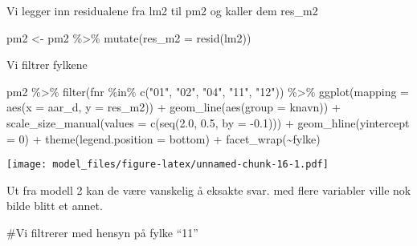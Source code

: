 \documentclass[
]{article}
\newenvironment{Shaded}{\begin{snugshade}}{\end{snugshade}}
\newcommand{\AttributeTok}[1]{\textcolor[rgb]{0.77,0.63,0.00}{#1}}
\newcommand{\DecValTok}[1]{\textcolor[rgb]{0.00,0.00,0.81}{#1}}
\newcommand{\FloatTok}[1]{\textcolor[rgb]{0.00,0.00,0.81}{#1}}
\newcommand{\FunctionTok}[1]{\textcolor[rgb]{0.00,0.00,0.00}{#1}}
\newcommand{\NormalTok}[1]{#1}
\newcommand{\OtherTok}[1]{\textcolor[rgb]{0.56,0.35,0.01}{#1}}
\newcommand{\SpecialCharTok}[1]{\textcolor[rgb]{0.00,0.00,0.00}{#1}}
\newcommand{\StringTok}[1]{\textcolor[rgb]{0.31,0.60,0.02}{#1}}
\begin{document}
Vi legger inn residualene fra lm2 til pm2 og kaller dem res\_m2

\begin{Shaded}
\begin{Highlighting}[]
\NormalTok{pm2 }\OtherTok{\textless{}{-}}\NormalTok{ pm2 }\SpecialCharTok{\%\textgreater{}\%}
  \FunctionTok{mutate}\NormalTok{(}\AttributeTok{res\_m2 =} \FunctionTok{resid}\NormalTok{(lm2))}
\end{Highlighting}
\end{Shaded}

Vi filtrer fylkene

\begin{Shaded}
\begin{Highlighting}[]
\NormalTok{pm2 }\SpecialCharTok{\%\textgreater{}\%} \FunctionTok{filter}\NormalTok{(fnr }\SpecialCharTok{\%in\%} \FunctionTok{c}\NormalTok{(}\StringTok{"01"}\NormalTok{, }\StringTok{"02"}\NormalTok{, }\StringTok{"04"}\NormalTok{, }\StringTok{"11"}\NormalTok{, }\StringTok{"12"}\NormalTok{)) }\SpecialCharTok{\%\textgreater{}\%}
\FunctionTok{ggplot}\NormalTok{(}\AttributeTok{mapping =} \FunctionTok{aes}\NormalTok{(}\AttributeTok{x =}\NormalTok{ aar\_d, }\AttributeTok{y =}\NormalTok{ res\_m2)) }\SpecialCharTok{+}
\FunctionTok{geom\_line}\NormalTok{(}\FunctionTok{aes}\NormalTok{(}\AttributeTok{group =}\NormalTok{ knavn)) }\SpecialCharTok{+}
\FunctionTok{scale\_size\_manual}\NormalTok{(}\AttributeTok{values =} \FunctionTok{c}\NormalTok{(}\FunctionTok{seq}\NormalTok{(}\FloatTok{2.0}\NormalTok{, }\FloatTok{0.5}\NormalTok{, }\AttributeTok{by =} \SpecialCharTok{{-}}\FloatTok{0.1}\NormalTok{))) }\SpecialCharTok{+}
\FunctionTok{geom\_hline}\NormalTok{(}\AttributeTok{yintercept =} \DecValTok{0}\NormalTok{) }\SpecialCharTok{+}
\FunctionTok{theme}\NormalTok{(}\AttributeTok{legend.position =} \StringTok{\textquotesingle{}bottom\textquotesingle{}}\NormalTok{) }\SpecialCharTok{+}
  \FunctionTok{facet\_wrap}\NormalTok{(}\SpecialCharTok{\textasciitilde{}}\NormalTok{fylke)}
\end{Highlighting}
\end{Shaded}

\texttt{[image: model\_files/figure-latex/unnamed-chunk-16-1.pdf]}

Ut fra modell 2 kan de være vanskelig å eksakte svar. med flere
variabler ville nok bilde blitt et annet.

\#Vi filtrerer med hensyn på fylke ``11''
\end{document}
